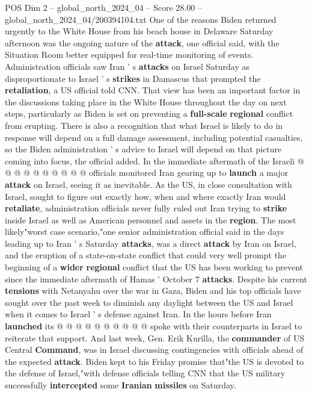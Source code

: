 \begin{textsample}{POS Dim 2 – global\_north\_2024\_04 – Score 28.00 – global\_north\_2024\_04/200394104.txt}
One of the reasons Biden returned urgently to the White House from his beach house in Delaware Saturday afternoon was the ongoing nature of the \textbf{attack}, one official said, with the Situation Room better equipped for real-time monitoring of events.
Administration officials saw Iran ' s \textbf{attacks} on Israel Saturday as disproportionate to Israel ' s \textbf{strikes} in Damascus that prompted the \textbf{retaliation}, a US official told CNN.
That view has been an important factor in the discussions taking place in the White House throughout the day on next steps, particularly as Biden is set on preventing a \textbf{full-scale} \textbf{regional} conflict from erupting.
There is also a recognition that what Israel is likely to do in response will depend on a full damage assessment, including potential casualties, so the Biden administration ' s advice to Israel will depend on that picture coming into focus, the official added.
In the immediate aftermath of the Israeli @ @ @ @ @ @ @ @ @ @ officials monitored Iran gearing up to \textbf{launch} a major \textbf{attack} on Israel, seeing it as inevitable.
As the US, in close consultation with Israel, sought to figure out exactly how, when and where exactly Iran would \textbf{retaliate}, administration officials never fully ruled out Iran trying to \textbf{strike} inside Israel as well as American personnel and assets in the \textbf{region}.
The most likely"worst case scenario,"one senior administration official said in the days leading up to Iran ' s Saturday \textbf{attacks}, was a direct \textbf{attack} by Iran on Israel, and the eruption of a state-on-state conflict that could very well prompt the beginning of a \textbf{wider} \textbf{regional} conflict that the US has been working to prevent since the immediate aftermath of Hamas ' October 7 \textbf{attacks}.
Despite his current \textbf{tensions} with Netanyahu over the war in Gaza, Biden and his top officials have sought over the past week to diminish any daylight between the US and Israel when it comes to Israel ' s defense against Iran.
In the hours before Iran \textbf{launched} its @ @ @ @ @ @ @ @ @ @ spoke with their counterparts in Israel to reiterate that support.
And last week, Gen.
Erik Kurilla, the \textbf{commander} of US Central \textbf{Command}, was in Israel discussing contingencies with officials ahead of the expected \textbf{attack}.
Biden kept to his Friday promise that"the US is devoted to the defense of Israel,"with defense officials telling CNN that the US military successfully \textbf{intercepted} some \textbf{Iranian} \textbf{missiles} on Saturday.

\end{textsample}
